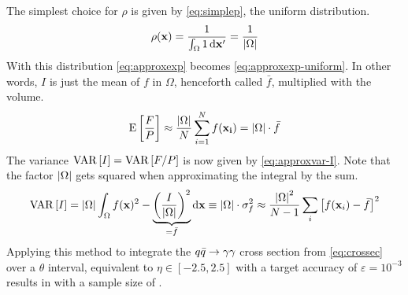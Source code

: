 The simplest choice for \(\rho\) is given
by \cref{eq:simplep}, the uniform distribution.
%
\begin{equation}
  \label{eq:simplep}
  \rho(\vb{x}) = \frac{1}{\int_{\Omega}1\dd{\vb{x'}}} =
  \frac{1}{\abs{\Omega}}
\end{equation}
%
With this distribution \cref{eq:approxexp}
becomes \cref{eq:approxexp-uniform}. In other words, \(I\) is just
the mean of \(f\) in \(\Omega\), henceforth
called \(\bar{f}\), multiplied with the volume.
%
\begin{equation}
  \label{eq:approxexp-uniform}
  \operatorname{E}\qty[\frac{F}{P}] \approx
  \frac{\abs{\Omega}}{N}\sum_{i=1}^N f(\vb{x_i}) = \abs{\Omega}\cdot\bar{f}
\end{equation}
%
The variance \(\operatorname{VAR}\qty[I]=\operatorname{VAR}\qty[F/P]\) is now given
by \cref{eq:approxvar-I}. Note that the factor \(\abs{\Omega}\) gets
squared when approximating the integral by the sum.
%
\begin{equation}
  \label{eq:approxvar-I}
  \operatorname{VAR}\qty[I] = \abs{\Omega}\int_\Omega f(\vb{x})^2 -
  \underbrace{\qty(\frac{I}{\abs{\Omega}})^2}_{=\bar{f}} \dd{\vb{x}} \equiv \abs{\Omega}\cdot\sigma_f^2 \approx
  \frac{\abs{\Omega}^2}{N-1}\sum_{i}\qty[f(\vb{x}_i) - \bar{f}]^2
\end{equation}
%
Applying this method to integrate the \(q\bar{q}\rightarrow\gamma\gamma\) cross section from
\cref{eq:crossec} over a \(\theta\) interval, equivalent to
\(\eta\in [-2.5, 2.5]\) with a target accuracy of
\(\varepsilon=10^{-3}\) results in  with a
sample size of .

